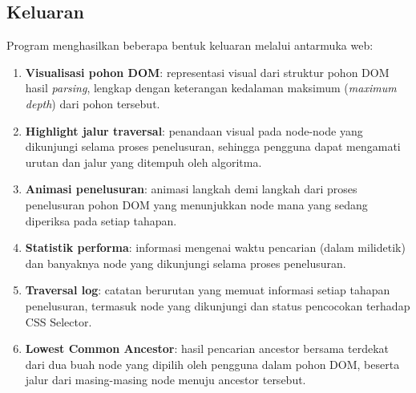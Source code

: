 \subsection{Keluaran}

Program menghasilkan beberapa bentuk keluaran melalui antarmuka web:

\begin{enumerate}
    \item \textbf{Visualisasi pohon DOM}: representasi visual dari struktur
    pohon DOM hasil \textit{parsing}, lengkap dengan keterangan kedalaman
    maksimum (\textit{maximum depth}) dari pohon tersebut.

    \item \textbf{Highlight jalur traversal}: penandaan visual pada
    node-node yang dikunjungi selama proses penelusuran, sehingga pengguna
    dapat mengamati urutan dan jalur yang ditempuh oleh algoritma.

    \item \textbf{Animasi penelusuran}: animasi langkah demi langkah dari
    proses penelusuran pohon DOM yang menunjukkan node mana yang sedang
    diperiksa pada setiap tahapan.

    \item \textbf{Statistik performa}: informasi mengenai waktu pencarian
    (dalam milidetik) dan banyaknya node yang dikunjungi selama proses
    penelusuran.

    \item \textbf{Traversal log}: catatan berurutan yang memuat informasi
    setiap tahapan penelusuran, termasuk node yang dikunjungi dan status
    pencocokan terhadap CSS Selector.

    \item \textbf{Lowest Common Ancestor}: hasil pencarian ancestor bersama
    terdekat dari dua buah node yang dipilih oleh pengguna dalam pohon DOM,
    beserta jalur dari masing-masing node menuju ancestor tersebut.
\end{enumerate}

